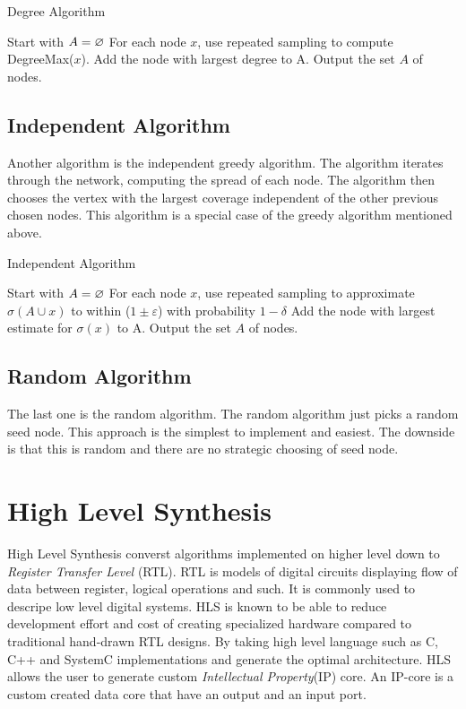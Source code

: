 \begin{algorithm}
\caption{Degree Algorithm}
\begin{algorithmic}[1]
\State Start with $A = \oldemptyset$
\State For each node $x$, use repeated sampling to compute DegreeMax($x$).
\State Add the node with largest degree to A.
\EndWhile
\State Output the set $A$ of nodes.
\end{algorithmic}
\end{algorithm}

\subsection{Independent Algorithm}
Another algorithm is the independent greedy algorithm. The algorithm iterates through the network, computing the spread of each node. The algorithm then chooses the vertex with the largest coverage independent of the other previous chosen nodes. This algorithm is a special case of the greedy algorithm mentioned above.

\begin{algorithm}
\caption{Independent Algorithm}
\begin{algorithmic}[1]
\State Start with $A = \oldemptyset$
\State For each node $x$, use repeated sampling to approximate $\sigma(A \cup {x}) $ to within ($1 \pm \varepsilon$) with probability
$1 − \delta$
\State Add the node with largest estimate for $\sigma({x})$ to A.
\EndWhile
\State Output the set $A$ of nodes.
\end{algorithmic}
\end{algorithm}



\subsection{Random Algorithm}
The last one is the random algorithm. The random algorithm just picks a random seed node. This approach is the simplest to implement and easiest. The downside is that this is random and there are no strategic choosing of seed node. 

 
 
\section{High Level Synthesis}

High Level Synthesis converst algorithms implemented on higher level down to \textit{Register Transfer Level} (RTL)\cite{HLSTutorial}. RTL is models of digital circuits displaying flow of data between register, logical operations and such. It is commonly used to descripe low level digital systems. HLS is known to be able to reduce development effort and cost of creating specialized hardware compared to traditional hand-drawn RTL designs\cite{zhao2016improving}\cite{Zuo:2013:IHL:2435264.2435271}\cite{HLSTutorial}. By taking high level language such as C, C++ and SystemC implementations and generate the optimal architecture. HLS allows the user to generate custom \textit{Intellectual Property}(IP) core. An IP-core is a custom created data core that have an output and an input port.



